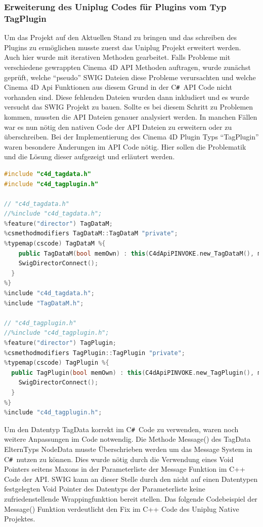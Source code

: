 \documentclass[pagesize, paper=a4, fontsize=12pt,titlepage=true, headings=small, headnosepline, abstractoff, liststotoc, nochapterprefix, plainheadsepline, twoside]{scrreprt}
\newcommand{\CSS}{C\texttt{\# }}
\begin{document}
\subsubsection{Erweiterung des Uniplug Codes für Plugins vom Typ TagPlugin}
Um das Projekt auf den Aktuellen Stand zu bringen und das schreiben des Plugins zu ermöglichen musste zuerst das Uniplug Projekt erweitert werden. Auch hier wurde mit iterativen Methoden gearbeitet. Falls Probleme mit verschiedene gewrappten Cinema 4D API Methoden auftragen, wurde zunächst geprüft, welche “pseudo” SWIG Dateien diese Probleme verursachten und welche Cinema 4D Api Funktionen aus diesem Grund in der \CSS API Code nicht vorhanden sind. Diese fehlenden Dateien wurden dann inkludiert und es wurde versucht das SWIG Projekt zu bauen. Sollte es bei diesem Schritt zu Problemen kommen, mussten die API Dateien genauer analysiert werden. In manchen Fällen war es nun nötig den nativen Code der API Dateien zu erweitern oder zu überschreiben. Bei der Implementierung des Cinema 4D Plugin Typs “TagPlugin” waren besondere Änderungen im API Code nötig. Hier sollen die Problematik und die Lösung dieser aufgezeigt und erläutert werden.
\\
\begin{lstlisting}[language=C++, caption = Einbinden des Maxon Cinema 4D C++ Datentyps TagPlugin in die \CSS API von Uniplug]
#include "c4d_tagdata.h"
#include "c4d_tagplugin.h"

// "c4d_tagdata.h"
//%include "c4d_tagdata.h";
%feature("director") TagDataM;
%csmethodmodifiers TagDataM::TagDataM "private";
%typemap(cscode) TagDataM %{
	public TagDataM(bool memOwn) : this(C4dApiPINVOKE.new_TagDataM(), memOwn) {
    SwigDirectorConnect();
  }
%}
%include "c4d_tagdata.h";
%include "TagDataM.h";

// "c4d_tagplugin.h"
//%include "c4d_tagplugin.h";
%feature("director") TagPlugin;
%csmethodmodifiers TagPlugin::TagPlugin "private";
%typemap(cscode) TagPlugin %{
  public TagPlugin(bool memOwn) : this(C4dApiPINVOKE.new_TagPlugin(), memOwn) {
    SwigDirectorConnect();
  }
%}
%include "c4d_tagplugin.h";
\end{lstlisting}

Um den Datentyp TagData korrekt im \CSS Code zu verwenden, waren noch weitere Anpassungen im Code notwendig. Die Methode Message() des TagData ElternTyps NodeData musste Überschrieben werden um das Message System in \CSS nutzen zu können. Dies wurde nötig durch die Verwendung eines Void Pointers seitens Maxons in der Parameterliste der Message Funktion im C++ Code der API. SWIG kann an dieser Stelle durch den nicht auf einen Datentypen festgelegten Void Pointer des Datentyps der Parameterliste keine zufriedenstellende Wrappingfunktion bereit stellen. Das folgende Codebeispiel der Message() Funktion verdeutlicht den Fix im C++ Code des Uniplug Native Projektes.
\end{document}

